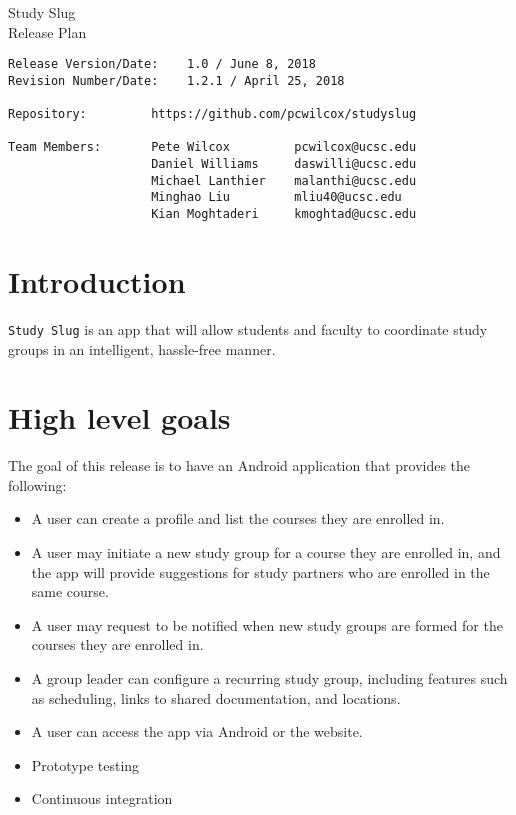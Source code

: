 \documentclass[10pt]{article}
\begin{document}
    
    \begin{center}
        \Huge{Study Slug} \\
        \Large{Release Plan}
    \end{center}
    \begin{verbatim}
Release Version/Date:    1.0 / June 8, 2018        
Revision Number/Date:    1.2.1 / April 25, 2018

Repository:         https://github.com/pcwilcox/studyslug

Team Members:       Pete Wilcox         pcwilcox@ucsc.edu    
                    Daniel Williams     daswilli@ucsc.edu  
                    Michael Lanthier    malanthi@ucsc.edu  
                    Minghao Liu         mliu40@ucsc.edu
                    Kian Moghtaderi     kmoghtad@ucsc.edu
    \end{verbatim}
    
    \section{Introduction}
    \texttt{Study Slug} is an app that will allow students and faculty to coordinate study groups in an intelligent, hassle-free manner.
    
    \section{High level goals}
    The goal of this release is to have an Android application that provides the following:
    \begin{itemize}
        \item A user can create a profile and list the courses they are enrolled in.
        \item A user may initiate a new study group for a course they are enrolled in, and the app will provide suggestions for study partners who are enrolled in the same course.
        \item A user may request to be notified when new study groups are formed for the courses they are enrolled in.
        \item A group leader can configure a recurring study group, including features such as scheduling, links to shared documentation, and locations.
        \item A user can access the app via Android or the website.
        \item Prototype testing
        \item Continuous integration
    \end{itemize}
    
\end{document}
